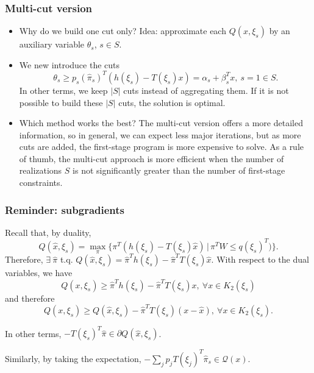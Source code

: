 \documentclass{beamer}
\begin{document}
\begin{frame}
\frametitle{Multi-cut version}

\begin{itemize}
	\item
	Why do we build one cut only?
	{\red Idea}: approximate {\blue each} $Q(x,\xi_s)$ by an auxiliary variable $\theta_s$, $s \in S$.
	\item
	We new introduce the cuts
	\[
	\theta_s \geq p_s(\hat{\pi}_s)^T(h(\xi_s) - T(\xi_s)x) = \alpha_s +
	\beta_s^Tx,\ s = 1 \in S.
	\]
	In other terms, we keep $|S|$ cuts instead of aggregating them.
	If it is not possible to build these $|S|$ cuts, the solution is optimal.
	\item
	Which method works the best?
	The multi-cut version offers a more detailed information, so in general, we can expect less major iterations, but as more cuts are added, the first-stage program is more expensive to solve.
	As a rule of thumb, the multi-cut approach is more efficient when the number of realizations $S$ is not significantly greater than the number of first-stage constraints.
\end{itemize}

\end{frame}

\begin{frame}
\frametitle{Reminder: subgradients}

Recall that, by {\blue duality},
\[
Q(\hat{x}, \xi_s) =
\max_{\pi} \lbrace \pi^T(h(\xi_s)-T(\xi_s)\hat{x}) \,|\, \pi^TW \leq q(\xi_s)^T) \rbrace.
\]
Therefore, $\exists\ \hat{\pi}$ t.q.
$Q(\hat{x}, \xi_s) = \hat{\pi}^Th(\xi_s)-\hat{\pi}^TT(\xi_s)\hat{x}$.
With respect to the dual variables, we have
\[
Q(x, \xi_s) \geq \hat{\pi}^Th(\xi_s)-\hat{\pi}^TT(\xi_s) x,
\ \forall x \in K_2(\xi_s)
\]
and therefore
\[
Q(x, \xi_s) \geq Q({\hat{x}, \xi_s}) - \hat{\pi}^TT(\xi_s) (x-\hat{x}),
\ \forall x \in K_2(\xi_s).
\]

In other terms, $-T(\xi_s)^T\hat{\pi} \in \partial Q(\hat{x}, \xi_s)$.

\mbox{}

Similarly, by taking the expectation, $- \sum_j p_j T(\xi_j)^T\hat{\pi}_s \in \mathcal{Q}(x)$.

\end{frame}
\end{document}
